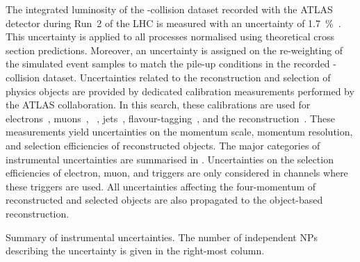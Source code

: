 The integrated luminosity of the \pp-collision dataset recorded with the ATLAS
detector during Run~2 of the LHC is measured with an uncertainty of
\SI{1.7}{\percent}~\cite{ATLAS-CONF-2019-021}. This uncertainty is applied to
all processes normalised using theoretical cross section predictions. Moreover,
an uncertainty is assigned on the re-weighting of the simulated event samples to
match the pile-up conditions in the recorded \pp-collision
dataset. Uncertainties related to the reconstruction and selection of physics
objects are provided by dedicated calibration measurements performed by the
ATLAS collaboration. In this search, these calibrations are used for
electrons~\cite{EGAM-2018-01,TRIG-2018-05}, muons~\cite{MUON-2018-03},
\tauhadvis~\cite{ATLAS-CONF-2017-029}, jets~\cite{JETM-2018-05},
flavour-tagging~\cite{FTAG-2018-01,FTAG-2020-08,FTAG-2021-002}, and the
\pTmissAbs reconstruction~\cite{ATLAS-CONF-2018-023}. These measurements yield
uncertainties on the momentum scale, momentum resolution, and selection
efficiencies of reconstructed objects. The major categories of instrumental
uncertainties are summarised in
. Uncertainties on the selection
efficiencies of electron, muon, and \tauhadvis triggers are only considered in
channels where these triggers are used. All uncertainties affecting the
four-momentum of reconstructed and selected objects are also propagated to the
object-based \pTmissAbs reconstruction.


\begin{table}[htbp]
  \centering

  \caption{Summary of instrumental uncertainties. The number of independent NPs
    describing the uncertainty is given in the right-most column.}%
  \label{tab:experimental_uncertainties_2}

  { \renewcommand{\arraystretch}{1.5}  }
\end{table}


